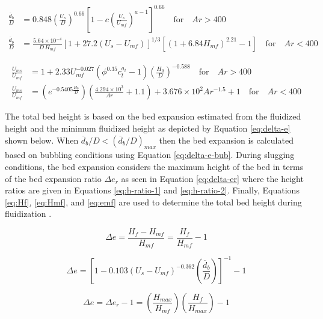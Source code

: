\documentclass[12pt,titlepage]{article}
\begin{document}
\begin{align}
    \frac{\overline{d}_b}{D} &= 0.848 \left(\frac{U_s}{D} \right)^{0.66} \left[1 - c \left(\frac{U_s}{U_{mf}} \right)^{a - 1} \right]^{0.66} \quad \text{for}\quad Ar > 400 \label{eq:db-D-1} \\
    \frac{\overline{d}_b}{D} &= \frac{5.64\times10^{-4}}{D\,H_{mf}} \left[1 + 27.2 (U_s - U_{mf}) \right]^{1/3} \left[(1 + 6.84 H_{mf})^{2.21} - 1 \right] \quad \text{for}\quad Ar < 400 \label{eq:db-D-2}
\end{align}

\begin{align}
    \frac{U_{ms}}{U_{mf}} &= 1 + 2.33 U_{mf}^{-0.027} \left(\phi^{0.35} c_t^{a_t}-1 \right) \left(\frac{H_0}{D} \right)^{-0.588} \quad \text{for}\quad Ar > 400 \label{eq:Ums-Umf-1} \\
    \frac{U_{ms}}{U_{mf}} &= \left(e^{-0.5405 \frac{H_0}{D}} \right) \left(\frac{4.294\times10^3}{Ar} + 1.1 \right) + 3.676\times10^2 Ar^{-1.5} + 1 \quad \text{for}\quad Ar < 400 \label{eq:Ums-Umf-2}
\end{align}

The total bed height is based on the bed expansion estimated from the fluidized height and the minimum fluidized height as depicted by Equation \ref{eq:delta-e} shown below. When $\overline{d}_b/D < (\overline{d}_b/D)_{max}$ then the bed expansion is calculated based on bubbling conditions using Equation \ref{eq:delta-e-bub}. During slugging conditions, the bed expansion considers the maximum height of the bed in terms of the bed expansion ratio $\Delta e_r$ as seen in Equation \ref{eq:delta-er} where the height ratios are given in Equations \ref{eq:h-ratio-1} and \ref{eq:h-ratio-2}. Finally, Equations \ref{eq:Hf}, \ref{eq:Hmf}, and \ref{eq:emf} are used to determine the total bed height during fluidization \cite{Agu-2019b, Agu-2019f, Agu-2019g, Wen-1966}.

\begin{equation} \label{eq:delta-e}
    \Delta e = \frac{H_f - H_{mf}}{H_{mf}} = \frac{H_f}{H_{mf}} - 1
\end{equation}

\begin{equation} \label{eq:delta-e-bub}
    \Delta e = \left[ 1 - 0.103 (U_s - U_{mf})^{-0.362} \left( \frac{\overline{d}_b}{D} \right) \right]^{-1} - 1
\end{equation}

\begin{equation} \label{eq:delta-er}
    \Delta e = \Delta e_r - 1 = \left(\frac{H_{max}}{H_{mf}}\right) \left(\frac{H_f}{H_{max}}\right) - 1
\end{equation}
\end{document}
